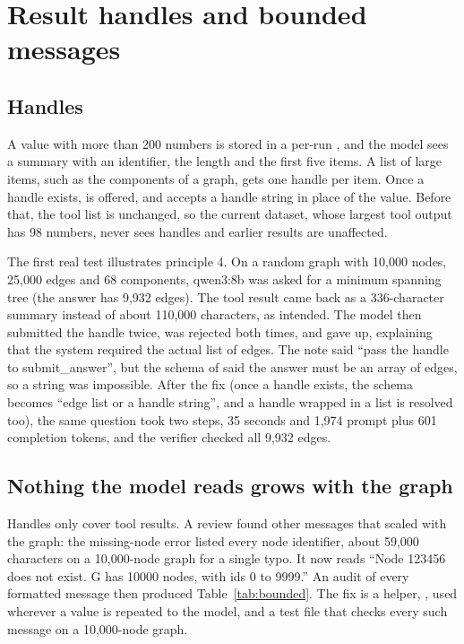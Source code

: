 \section{Result handles and bounded messages}
\label{sec:handles}

\subsection{Handles}

A value with more than 200 numbers is stored in a per-run , and the model sees a summary with an
identifier, the length and the first five items. A list of large items, such as the components of a graph, gets one
handle per item. Once a handle exists,  is offered, and 
accepts a handle string in place of the value. Before that, the tool list is unchanged, so the current dataset, whose
largest tool output has 98 numbers, never sees handles and earlier results are unaffected.

The first real test illustrates principle 4. On a random graph with 10,000 nodes, 25,000 edges and 68 components,
qwen3:8b was asked for a minimum spanning tree (the answer has 9,932 edges). The tool result came back as a
336-character summary instead of about 110,000 characters, as intended. The model then submitted the handle twice,
was rejected both times, and gave up, explaining that the system required the actual list of edges. The note said
``pass the handle to submit\_answer'', but the schema of  said the answer must be an array of
edges, so a string was impossible. After the fix (once a handle exists, the schema becomes ``edge list or a handle
string'', and a handle wrapped in a list is resolved too), the same question took two steps, 35 seconds and 1,974
prompt plus 601 completion tokens, and the verifier checked all 9,932 edges.

\subsection{Nothing the model reads grows with the graph}

Handles only cover tool results. A review found other messages that scaled with the graph: the missing-node error
listed every node identifier, about 59,000 characters on a 10,000-node graph for a single typo. It now reads ``Node
123456 does not exist. G has 10000 nodes, with ids 0 to 9999.'' An audit of every formatted message then produced
Table~\ref{tab:bounded}. The fix is a helper, , used wherever a value is repeated to the model, and a
test file that checks every such message on a 10,000-node graph.

